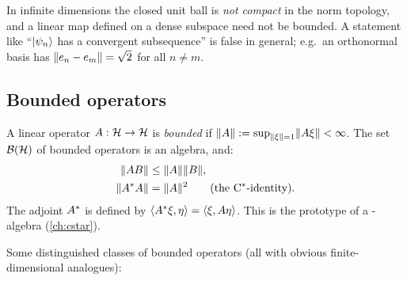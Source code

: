 \begin{whatwrong}
In infinite dimensions the closed unit ball is \emph{not compact} in the norm topology, and a linear map defined on a dense subspace need not be bounded. A statement like ``$\lvert \psi_n\rangle$ has a convergent subsequence'' is false in general; e.g.\ an orthonormal basis has $\lVert e_n-e_m\rVert=\sqrt2$ for all $n\ne m$.
\end{whatwrong}

\subsection{Bounded operators}

A linear operator $A:\mathcal{H}\to\mathcal{H}$ is \emph{bounded} if $\lVert A\rVert:=\sup_{\lVert \xi\rVert=1}\lVert A\xi\rVert<\infty$. The set $\mathcal{B}(\mathcal{H})$ of bounded operators is an algebra, and:
\begin{align}
\lVert AB\rVert&\le\lVert A\rVert\lVert B\rVert,\\
\lVert A^{*} A\rVert&=\lVert A\rVert^2\qquad(\text{the C$^*$-identity}).
\end{align}
The adjoint $A^{*}$ is defined by $\langle A^{*}\xi,\eta\rangle=\langle \xi,A\eta\rangle$. This is the prototype of a \cstar-algebra (\cref{ch:cstar}).

\mshift{26mm}
Some distinguished classes of bounded operators (all with obvious finite-dimensional analogues):
\begin{center}
\renewcommand{\arraystretch}{1.25}
\end{center}

